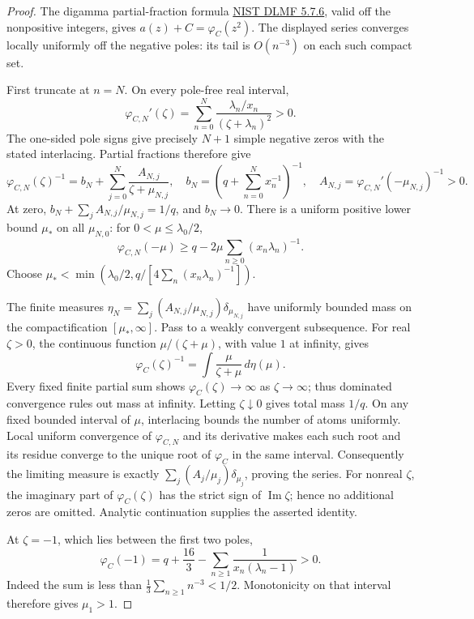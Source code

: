 \documentclass[11pt]{article}
\theoremstyle{remark}\newtheorem{remark}[theorem]{Remark}
\begin{document}
\begin{proof}
The digamma partial-fraction formula
\href{https://dlmf.nist.gov/5.7\#E6}{NIST DLMF 5.7.6},
valid off the nonpositive integers, gives
\(a(z)+C=\varphi_C(z^2)\). The displayed series converges locally
uniformly off the negative poles: its tail is \(O(n^{-3})\)
on each such compact set.

First truncate at \(n=N\). On every pole-free real interval,
\[
 \varphi_{C,N}'(\zeta)=
 \sum_{n=0}^N\frac{\lambda_n/x_n}{(\zeta+\lambda_n)^2}>0.
 \tag{RGC13}
\]
The one-sided pole signs give precisely \(N+1\) simple negative
zeros with the stated interlacing. Partial fractions therefore give
\[
 \varphi_{C,N}(\zeta)^{-1}
   =b_N+\sum_{j=0}^N\frac{A_{N,j}}{\zeta+\mu_{N,j}},
 \quad
 b_N=\left(q+\sum_{n=0}^Nx_n^{-1}\right)^{-1},
 \quad A_{N,j}=\varphi_{C,N}'(-\mu_{N,j})^{-1}>0.
 \tag{RGC14}
\]
At zero,
\(b_N+\sum_jA_{N,j}/\mu_{N,j}=1/q\), and \(b_N\to0\).
There is a uniform positive lower bound \(\mu_*\) on all
\(\mu_{N,0}\): for \(0<\mu\le\lambda_0/2\),
\[
 \varphi_{C,N}(-\mu)\ge
 q-2\mu\sum_{n\ge0}(x_n\lambda_n)^{-1}.
 \tag{RGC15}
\]
Choose \(\mu_*<\min(\lambda_0/2,
 q/[4\sum_n(x_n\lambda_n)^{-1}])\).

The finite measures
\(\eta_N=\sum_j(A_{N,j}/\mu_{N,j})\delta_{\mu_{N,j}}\)
have uniformly bounded mass on the compactification
\([\mu_*,\infty]\). Pass to a weakly convergent subsequence.
For real \(\zeta>0\), the continuous function
\(\mu/(\zeta+\mu)\), with value \(1\) at infinity, gives
\[
 \varphi_C(\zeta)^{-1}
   =\int\frac{\mu}{\zeta+\mu}\,d\eta(\mu).
 \tag{RGC16}
\]
Every fixed finite partial sum shows
\(\varphi_C(\zeta)\to\infty\) as \(\zeta\to\infty\);
thus dominated convergence rules out mass at infinity.
Letting \(\zeta\downarrow0\) gives total mass \(1/q\).
On any fixed bounded interval of \(\mu\), interlacing bounds the
number of atoms uniformly. Local uniform convergence of
\(\varphi_{C,N}\) and its derivative makes each such root and its
residue converge to the unique root of \(\varphi_C\) in the same
interval. Consequently the limiting measure is exactly
\(\sum_j(A_j/\mu_j)\delta_{\mu_j}\), proving the series.
For nonreal \(\zeta\), the imaginary part of
\(\varphi_C(\zeta)\) has the strict sign of
\(\operatorname{Im}\zeta\); hence no additional zeros are omitted.
Analytic continuation supplies the asserted identity.

At \(\zeta=-1\), which lies between the first two poles,
\[
 \varphi_C(-1)=q+\frac{16}{3}
       -\sum_{n\ge1}\frac1{x_n(\lambda_n-1)}>0.
 \tag{RGC17}
\]
Indeed the sum is less than
\(\frac13\sum_{n\ge1}n^{-3}<1/2\). Monotonicity on that interval
therefore gives \(\mu_1>1\).


\end{proof}
\end{document}
